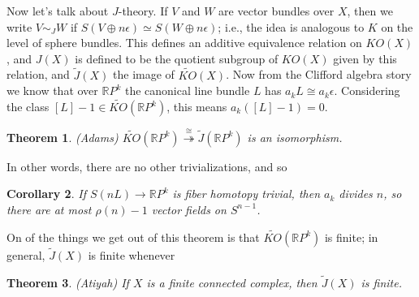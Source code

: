 \documentclass{article}
\newcommand{\R}{\mathbb{R}}
\newcommand{\RP}{\R P}
\newcommand{\onto}{\twoheadrightarrow}
\newtheorem{thm}{Theorem}[section]
\newtheorem{cor}[thm]{Corollary}
\begin{document}
Now let's talk about $J$-theory.  If $V$ and $W$ are vector bundles over $X$, then we write $V \sim_J W$ if $S(V \oplus n \epsilon) \simeq S(W \oplus n \epsilon)$; i.e., the idea is analogous to $K$ on the level of sphere bundles.  This defines an additive equivalence relation on $KO(X)$, and $J(X)$ is defined to be the quotient subgroup of $KO(X)$ given by this relation, and $\tilde J(X)$ the image of $\widetilde{KO}(X)$.  Now from the Clifford algebra story we know that over $\RP^k$ the canonical line bundle $L$ has $a_k L \cong a_k \epsilon$.  Considering the class $[L] - 1 \in \widetilde{KO}(\RP^k)$, this means $a_k([L] - 1) = 0$.
\begin{thm}(Adams)
$\widetilde{KO}(\RP^k) \stackrel{\cong}{\onto} \tilde J(\RP^k)$ is an isomorphism.
\end{thm}
In other words, there are no other trivializations, and so
\begin{cor}
If $S(nL) \to \RP^k$ is fiber homotopy trivial, then $a_k$ divides $n$, so there are at most $\rho(n) - 1$ vector fields on $S^{n-1}$.
\end{cor}
On of the things we get out of this theorem is that $\widetilde{KO}(\RP^k)$ is finite; in general, $\tilde J(X)$ is finite whenever
\begin{thm}(Atiyah)
If $X$ is a finite connected complex, then $\tilde J(X)$ is finite.
\end{thm}
\end{document}
